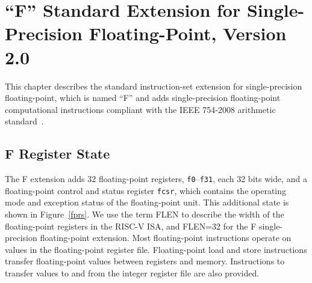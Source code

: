 \chapter{``F'' Standard Extension for Single-Precision Floating-Point,
Version 2.0}
\label{sec:single-float}

This chapter describes the standard instruction-set extension for
single-precision floating-point, which is named ``F'' and adds
single-precision floating-point computational instructions compliant
with the IEEE 754-2008 arithmetic standard~\cite{ieee754-2008}.


\section{F Register State}

The F extension adds 32 floating-point registers, {\tt f0}--{\tt f31},
each 32 bits wide, and a floating-point control and status register
{\tt fcsr}, which contains the operating mode and exception status of the
floating-point unit.  This additional state is shown in
Figure~\ref{fprs}.  We use the term FLEN to describe the width of the
floating-point registers in the RISC-V ISA, and FLEN=32 for the F
single-precision floating-point extension.  Most floating-point
instructions operate on values in the floating-point register file.
Floating-point load and store instructions transfer floating-point
values between registers and memory.  Instructions to transfer values
to and from the integer register file are also provided.

